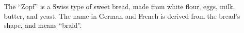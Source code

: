The ``Zopf'' is a Swiss type of sweet bread, made from white flour, eggs, milk, butter, and yeast.
The name in German and French is derived from the bread's shape, and means ``braid''.